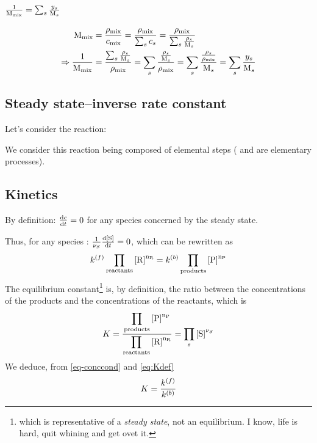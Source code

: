 \section{\texorpdfstring{$\frac{1}{\Mm[\text{mix}]} = \sum_s \frac{\massfrac[s]}{\Mm[s]}$}{Mixture molar mass}}
\label{demo-Mm}
\[
\begin{split}
\Mm[\text{mix}] & = \frac{\mass[\text{mix}]}{\conc_\text{mix}}
                  = \frac{\mass[\text{mix}]}{\sum_s \conc_s}
                  = \frac{\mass[\text{mix}]}{\sum_s \frac{\mass[s]}{\Mm[s]}}\\
\Rightarrow
\frac{1}{\Mm[\text{mix}]}
               & = \frac{\sum_s\frac{\mass[s]}{\Mm[s]}}{\mass[\text{mix}]}
                 = \sum_s\frac{\frac{\mass[s]}{\Mm[s]}}{\mass[\text{mix}]}
                 = \sum_s\frac{\frac{\mass[s]}{\mass[\text{mix}]}}{\Mm[s]}
                 = \sum_s\frac{\massfrac[s]}{\Mm[s]}
\end{split}
\]

\subsection{Steady state--inverse rate constant}

Let's consider the reaction:
\begin{chemicalEquation}
\label{eq:equat}
\end{chemicalEquation}

We consider this reaction being composed of elemental steps
( and
are elementary processes). 

\subsection{Kinetics}
\label{demo-eq_kin}

By definition: $\frac{\dd \conc}{\dd t} = 0$ for any species concerned by the steady state.

Thus, for any species : 
$\frac{1}{\scoef[S]}\frac{\dd\conc[S]}{\dd t} =  0$, which can be rewritten as
\begin{equation}
\fwdratecons \prodReac = \bkwdratecons \prodProd
\label{eq-conccond}
\end{equation}
The equilibrium constant\footnote{which is representative of a \emph{steady state}, not
an equilibrium. I know, life is hard, quit whining and get ovet it.} is, by definition, the
ratio between the concentrations of the products and the concentrations of the reactants,
which is
\begin{equation}
\Eqconst 
         = \frac{\displaystyle\prodProd}
                {\displaystyle\prodReac}
         = \prod_{s}\conc[S]^{\scoef[S]} 
\label{eq:Kdef}
\end{equation}
We deduce, from \ref{eq-conccond} and \ref{eq:Kdef}
\begin{equation}
\Eqconst = \frac{\fwdratecons}{\bkwdratecons}
\end{equation}


